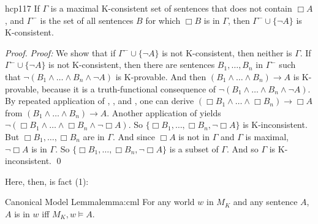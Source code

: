 \begin{observation}{hcp117}
  If $\Gamma$ is a maximal K-consistent set of sentences that does not
  contain $\Box A$, and $\Gamma^{-}$ is the set of all sentences $B$ for which
  $\Box B$ is in $\Gamma$, then $\Gamma^{-} \cup \{ \neg A \}$ is
  K-consistent.
\end{observation}
\begin{proof}
  \emph{Proof:} We show that if $\Gamma^{-} \cup \{ \neg A \}$ is not
  K-consistent, then neither is $\Gamma$. If $\Gamma^- \cup \{ \neg A \}$ is not
  K-consistent, then there are sentences $B_1,\ldots,B_n$ in $\Gamma^{-}$ such
  that $\neg(B_1\land\ldots\land B_n \land \neg A)$ is K-provable. And then
  $(B_1\land\ldots\land B_n) \to A$ is K-provable, because it is a
  truth-functional consequence of $\neg(B_1\land\ldots\land B_n \land \neg A)$.
  By repeated application of , , and , one can derive
  $(\Box B_1\land\ldots\land \Box B_n) \to \Box A$ from
  $(B_1\land\ldots\land B_n) \to A$. Another application of  yields
  $\neg (\Box B_1\land\ldots\land \Box B_n \land \neg\Box A)$. So
  $\{\Box B_1,\ldots,\Box B_n, \neg \Box A\}$ is K-inconsistent. But
  $\Box B_1,\ldots,\Box B_n$ are in $\Gamma$. And since $\Box A$ is not in
  $\Gamma$ and $\Gamma$ is maximal, $\neg \Box A$ is in $\Gamma$. So
  $\{\Box B_1,\ldots,\Box B_n, \neg \Box A\}$ is a subset of $\Gamma$. And so
  $\Gamma$ is K-inconsistent. \qed
\end{proof}

Here, then, is fact (1):

\begin{theorem}{Canonical Model Lemma}{lemma:cml}
  For any world $w$ in $M_K$ and any sentence $A$, $A$ is in $w$ iff
  $M_K,w \models A$.
\end{theorem}

